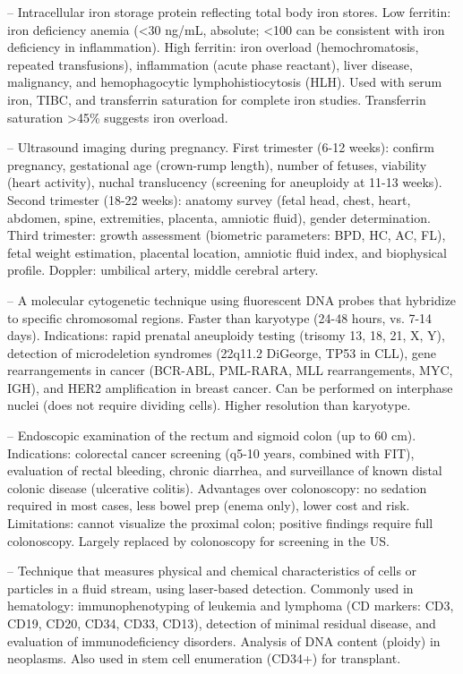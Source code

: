 -- Intracellular iron storage protein reflecting total body iron stores. Low ferritin: iron deficiency anemia (<30 ng/mL, absolute; <100 can be consistent with iron deficiency in inflammation). High ferritin: iron overload (hemochromatosis, repeated transfusions), inflammation (acute phase reactant), liver disease, malignancy, and hemophagocytic lymphohistiocytosis (HLH). Used with serum iron, TIBC, and transferrin saturation for complete iron studies. Transferrin saturation >45\% suggests iron overload.

-- Ultrasound imaging during pregnancy. First trimester (6-12 weeks): confirm pregnancy, gestational age (crown-rump length), number of fetuses, viability (heart activity), nuchal translucency (screening for aneuploidy at 11-13 weeks). Second trimester (18-22 weeks): anatomy survey (fetal head, chest, heart, abdomen, spine, extremities, placenta, amniotic fluid), gender determination. Third trimester: growth assessment (biometric parameters: BPD, HC, AC, FL), fetal weight estimation, placental location, amniotic fluid index, and biophysical profile. Doppler: umbilical artery, middle cerebral artery.

-- A molecular cytogenetic technique using fluorescent DNA probes that hybridize to specific chromosomal regions. Faster than karyotype (24-48 hours, vs. 7-14 days). Indications: rapid prenatal aneuploidy testing (trisomy 13, 18, 21, X, Y), detection of microdeletion syndromes (22q11.2 DiGeorge, TP53 in CLL), gene rearrangements in cancer (BCR-ABL, PML-RARA, MLL rearrangements, MYC, IGH), and HER2 amplification in breast cancer. Can be performed on interphase nuclei (does not require dividing cells). Higher resolution than karyotype.

-- Endoscopic examination of the rectum and sigmoid colon (up to 60 cm). Indications: colorectal cancer screening (q5-10 years, combined with FIT), evaluation of rectal bleeding, chronic diarrhea, and surveillance of known distal colonic disease (ulcerative colitis). Advantages over colonoscopy: no sedation required in most cases, less bowel prep (enema only), lower cost and risk. Limitations: cannot visualize the proximal colon; positive findings require full colonoscopy. Largely replaced by colonoscopy for screening in the US.

-- Technique that measures physical and chemical characteristics of cells or particles in a fluid stream, using laser-based detection. Commonly used in hematology: immunophenotyping of leukemia and lymphoma (CD markers: CD3, CD19, CD20, CD34, CD33, CD13), detection of minimal residual disease, and evaluation of immunodeficiency disorders. Analysis of DNA content (ploidy) in neoplasms. Also used in stem cell enumeration (CD34+) for transplant.

